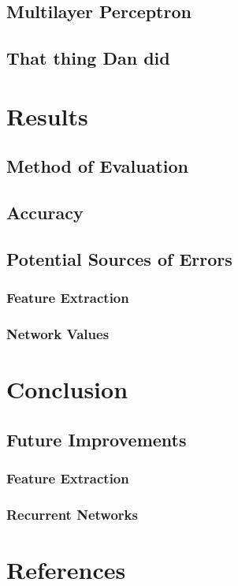 \documentclass[12pt]{article}
\begin{document}
\subsection{Multilayer Perceptron}


\subsection{That thing Dan did}

\section{Results}

\subsection{Method of Evaluation}

\subsection{Accuracy}

\subsection{Potential Sources of Errors}

\subsubsection{Feature Extraction}

\subsubsection{Network Values}

\section{Conclusion}

\subsection{Future Improvements}

\subsubsection{Feature Extraction}

\subsubsection{Recurrent Networks}


\section{References}
\end{document}
